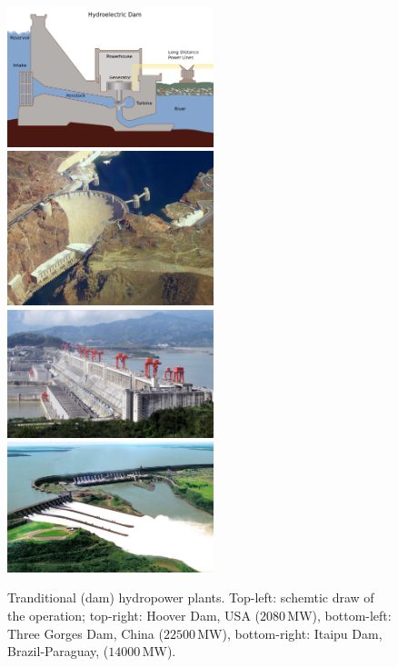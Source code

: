 \begin{figure}[ht!]
	\centering
		\includegraphics[width=6cm]{HydroAndWindPower/Figures/Schematics_Of_Traditional_Hydropower_Plants.png}
		\includegraphics[width=6cm]{HydroAndWindPower/Figures/Hoover_Dam.jpg}
		\includegraphics[width=6cm]{HydroAndWindPower/Figures/Three_Gorges_Dam.jpg}
		\includegraphics[width=6cm]{HydroAndWindPower/Figures/Itaipu_Dam.jpg}
	\caption{Tranditional (dam) hydropower plants. Top-left: schemtic draw of the operation; top-right: Hoover Dam, USA ($2080\,\mathrm{MW}$), bottom-left: Three Gorges Dam, China ($22500\,\mathrm{MW}$), bottom-right: Itaipu Dam, Brazil-Paraguay, ($14000\,\mathrm{MW}$).}
	\label{Fig:traditional_hydropower_plants}
\end{figure}

